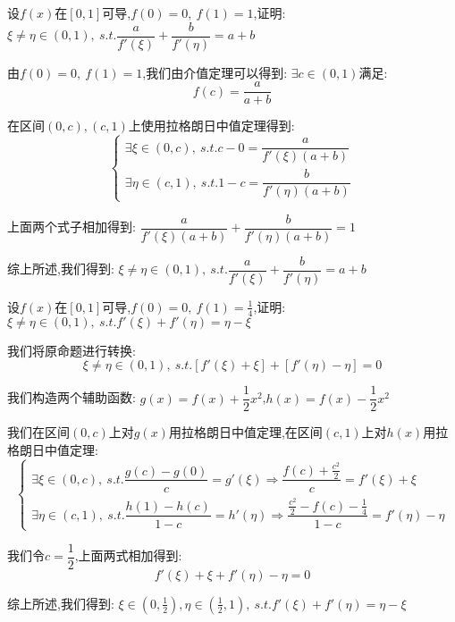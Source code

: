 \begin{proposition}
	设$f(x)$在$[0,1]$可导,$f(0)=0,\ f(1)=1$,证明: $\xi\neq \eta\in(0,1),\ s.t. \dfrac{a}{f'(\xi)}+\dfrac{b}{f'(\eta)}=a+b$
\end{proposition}
\begin{solution}

	由$f(0)=0,\ f(1)=1$,我们由介值定理可以得到: $\exists c\in(0,1)$满足:
	$$f(c)=\dfrac{a}{a+b}$$

	在区间$(0,c),(c,1)$上使用拉格朗日中值定理得到:
	$$\left\lbrace
		\begin{array}{l}
			\exists\xi\in(0,c),\ s.t. c-0=\dfrac{a}{f'(\xi)(a+b)} \\
			\exists\eta\in(c,1),\ s.t. 1-c=\dfrac{b}{f'(\eta)(a+b)}
		\end{array}
		\right. $$

	上面两个式子相加得到: $\dfrac{a}{f'(\xi)(a+b)}+\dfrac{b}{f'(\eta)(a+b)}=1$

	综上所述,我们得到: $\xi\neq \eta\in(0,1),\ s.t. \dfrac{a}{f'(\xi)}+\dfrac{b}{f'(\eta)}=a+b$
\end{solution}


\begin{proposition}
	设$f(x)$在$[0,1]$可导,$f(0)=0,\ f(1)=\frac{1}{4}$,证明: $\xi\neq \eta\in(0,1),\ s.t. f'(\xi)+f'(\eta)=\eta-\xi$
\end{proposition}
\begin{solution}

	我们将原命题进行转换:
	$$\xi\neq \eta\in(0,1),\ s.t. [f'(\xi)+\xi]+[f'(\eta)-\eta]=0$$

	我们构造两个辅助函数: $g(x)=f(x)+\dfrac{1}{2}x^2$,$h(x)=f(x)-\dfrac{1}{2}x^2$

	我们在区间$(0,c)$上对$g(x)$用拉格朗日中值定理,在区间$(c,1)$上对$h(x)$用拉格朗日中值定理:
	$$\left\lbrace
		\begin{array}{l}
			\exists\xi\in(0,c),\ s.t. \dfrac{g(c)-g(0)}{c}=g'(\xi)\Rightarrow \dfrac{f(c)+\frac{c^2}{2}}{c}=f'(\xi)+\xi \\
			\exists\eta\in(c,1),\ s.t. \dfrac{h(1)-h(c)}{1-c}=h'(\eta)\Rightarrow \dfrac{\frac{c^2}{2}-f(c)-\frac{1}{4}}{1-c}=f'(\eta)-\eta
		\end{array}
		\right. $$

	我们令$c=\dfrac{1}{2}$,上面两式相加得到:
	$$f'(\xi)+\xi+f'(\eta)-\eta=0$$

	综上所述,我们得到: $\xi\in(0,\frac{1}{2}),\eta\in(\frac{1}{2},1),\ s.t. f'(\xi)+f'(\eta)=\eta-\xi$

\end{solution}


